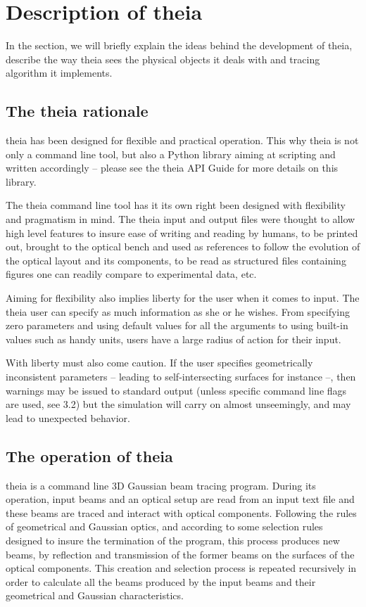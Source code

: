 \documentclass{article}
\begin{document}
\section{Description of theia}
In the section, we will briefly explain the ideas behind the development of theia, describe the way theia sees the physical objects it deals with and tracing algorithm it implements.

\subsection{The theia rationale}
theia has been designed for flexible and practical operation. This why theia is not only a command line tool, but also a Python library aiming at scripting and written accordingly -- please see the theia API Guide for more details on this library. 

The theia command line tool has it its own right been designed with flexibility and pragmatism in mind. The theia input and output files were thought to allow high level features to insure ease of writing and reading by humans, to be printed out, brought to the optical bench and used as references to follow the evolution of the optical layout and its components, to be read as structured files containing figures one can readily compare to experimental data, etc.

Aiming for flexibility also implies liberty for the user when it comes to input. The theia user can specify as much information as she or he wishes. From specifying zero parameters and using default values for all the arguments to using built-in values such as handy units, users have a large radius of action for their input.

With liberty must also come caution. If the user specifies geometrically inconsistent parameters -- leading to self-intersecting surfaces for instance --, then warnings may be issued to standard output (unless specific command line flags are used, see 3.2) but the simulation will carry on almost unseemingly, and may lead to unexpected behavior. 

\subsection{The operation of theia}
theia is a command line 3D Gaussian beam tracing program. During its operation, input beams and an optical setup are read from an input text file and these beams are traced and interact with optical components. Following the rules of geometrical and Gaussian optics, and according to some selection rules designed to insure the termination of the program, this process produces new beams, by reflection and transmission of the former beams on the surfaces of the optical components. This creation and selection process is repeated recursively in order to calculate all the beams produced by the input beams and their geometrical and Gaussian characteristics. 
\end{document}
